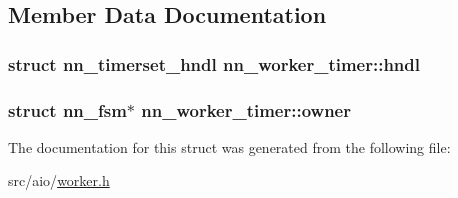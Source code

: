 \subsection{Member Data Documentation}
\subsubsection[{hndl}]{\setlength{\rightskip}{0pt plus 5cm}struct {\bf nn\+\_\+timerset\+\_\+hndl} nn\+\_\+worker\+\_\+timer\+::hndl}\hypertarget{structnn__worker__timer_abdd920512a278c6c4fa1db52e01b3ed1}{}\label{structnn__worker__timer_abdd920512a278c6c4fa1db52e01b3ed1}
\subsubsection[{owner}]{\setlength{\rightskip}{0pt plus 5cm}struct {\bf nn\+\_\+fsm}$\ast$ nn\+\_\+worker\+\_\+timer\+::owner}\hypertarget{structnn__worker__timer_afe2cfec1081fef9887670914c1a3195e}{}\label{structnn__worker__timer_afe2cfec1081fef9887670914c1a3195e}


The documentation for this struct was generated from the following file\+:\begin{DoxyCompactItemize}
\item 
src/aio/\hyperlink{worker_8h}{worker.\+h}\end{DoxyCompactItemize}

